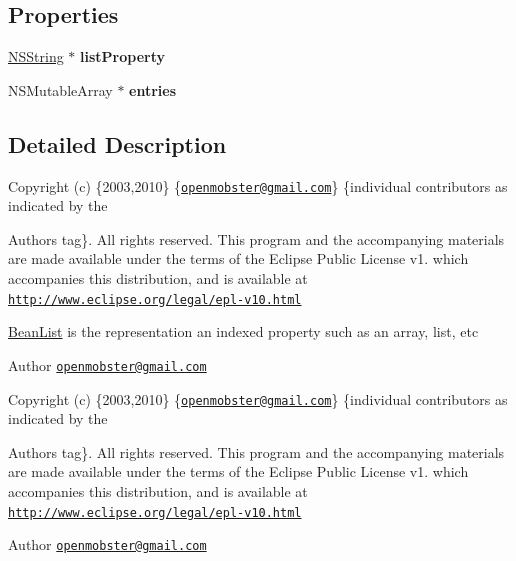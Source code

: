 \subsection*{\-Properties}
\begin{DoxyCompactItemize}
\item 
\hypertarget{interface_bean_list_a72cb4c81c0f5f1f1a492c55faac3f174}{
\hyperlink{class_n_s_string}{\-N\-S\-String} $\ast$ {\bfseries list\-Property}}
\label{interface_bean_list_a72cb4c81c0f5f1f1a492c55faac3f174}

\item 
\hypertarget{interface_bean_list_adcdb8907081fd0834b43f367e477720f}{
\-N\-S\-Mutable\-Array $\ast$ {\bfseries entries}}
\label{interface_bean_list_adcdb8907081fd0834b43f367e477720f}

\end{DoxyCompactItemize}


\subsection{\-Detailed \-Description}
\-Copyright (c) \{2003,2010\} \{\href{mailto:openmobster@gmail.com}{\tt openmobster@gmail.\-com}\} \{individual contributors as indicated by the \begin{DoxyAuthor}{\-Authors}
tag\}. \-All rights reserved. \-This program and the accompanying materials are made available under the terms of the \-Eclipse \-Public \-License v1. which accompanies this distribution, and is available at \href{http://www.eclipse.org/legal/epl-v10.html}{\tt http\-://www.\-eclipse.\-org/legal/epl-\/v10.\-html}
\end{DoxyAuthor}
\hyperlink{interface_bean_list}{\-Bean\-List} is the representation an indexed property such as an array, list, etc \begin{DoxyAuthor}{\-Author}
\href{mailto:openmobster@gmail.com}{\tt openmobster@gmail.\-com}
\end{DoxyAuthor}
\-Copyright (c) \{2003,2010\} \{\href{mailto:openmobster@gmail.com}{\tt openmobster@gmail.\-com}\} \{individual contributors as indicated by the \begin{DoxyAuthor}{\-Authors}
tag\}. \-All rights reserved. \-This program and the accompanying materials are made available under the terms of the \-Eclipse \-Public \-License v1. which accompanies this distribution, and is available at \href{http://www.eclipse.org/legal/epl-v10.html}{\tt http\-://www.\-eclipse.\-org/legal/epl-\/v10.\-html}
\end{DoxyAuthor}
\begin{DoxyAuthor}{\-Author}
\href{mailto:openmobster@gmail.com}{\tt openmobster@gmail.\-com} 
\end{DoxyAuthor}



